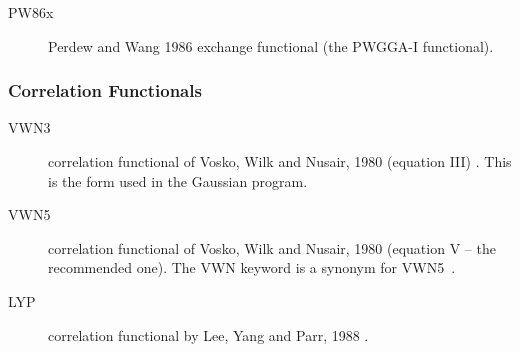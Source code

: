 \begin{description}
\begin{description}

\item[PW86x] Perdew and Wang 1986 exchange functional (the PWGGA-I functional)\cite{dft:pw86x}.



\end{description}

\subsubsection{Correlation Functionals}
\providecommand\corfn[1]{#1}
\begin{description}

\item[VWN3] correlation functional of Vosko, Wilk and Nusair, 1980 (equation III) 
  \cite{dft:vwn}. This is the form used in the Gaussian program.

\item[VWN5] correlation functional of Vosko, Wilk and Nusair, 1980 (equation
  V -- the recommended one). The VWN keyword is a synonym for VWN5~\cite{dft:vwn}.


\item[LYP] correlation functional by Lee, Yang and Parr, 1988
  \cite{dft:lyp1,dft:lyp2}.



\end{description}
\end{description}
